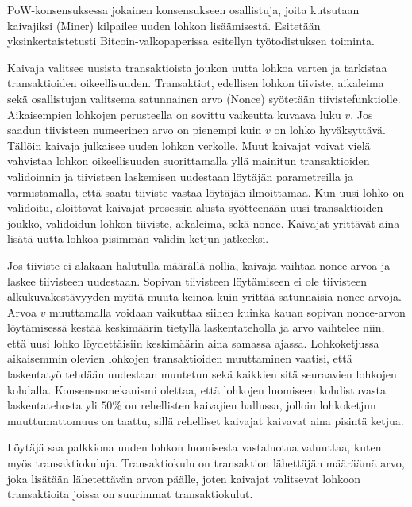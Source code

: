 PoW-konsensuksessa jokainen konsensukseen osallistuja, joita kutsutaan kaivajiksi (Miner) kilpailee uuden lohkon lisäämisestä. Esitetään yksinkertaistetusti Bitcoin-valkopaperissa esitellyn työtodistuksen toiminta.

Kaivaja valitsee uusista transaktioista joukon uutta lohkoa varten ja tarkistaa transaktioiden oikeellisuuden. Transaktiot, edellisen lohkon tiiviste, aikaleima sekä osallistujan valitsema satunnainen arvo (Nonce) syötetään tiivistefunktiolle. Aikaisempien lohkojen perusteella on sovittu vaikeutta kuvaava luku $v$. Jos saadun tiivisteen numeerinen arvo on pienempi kuin $v$ on lohko hyväksyttävä. Tällöin kaivaja julkaisee uuden lohkon verkolle. Muut kaivajat voivat vielä vahvistaa lohkon oikeellisuuden suorittamalla yllä mainitun transaktioiden validoinnin ja tiivisteen laskemisen uudestaan löytäjän parametreilla ja varmistamalla, että saatu tiiviste vastaa löytäjän ilmoittamaa. Kun uusi lohko on validoitu, aloittavat kaivajat prosessin alusta syötteenään uusi transaktioiden joukko, validoidun lohkon tiiviste, aikaleima, sekä nonce. Kaivajat yrittävät aina lisätä uutta lohkoa pisimmän validin ketjun jatkeeksi. 

Jos tiiviste ei alakaan halutulla määrällä nollia, kaivaja vaihtaa nonce-arvoa ja laskee tiivisteen uudestaan. Sopivan tiivisteen löytämiseen ei ole tiivisteen alkukuvakestävyyden myötä muuta keinoa kuin yrittää satunnaisia nonce-arvoja. Arvoa $v$ muuttamalla voidaan vaikuttaa siihen kuinka kauan sopivan nonce-arvon löytämisessä kestää keskimäärin tietyllä laskentateholla ja arvo vaihtelee niin, että uusi lohko löydettäisiin keskimäärin aina samassa ajassa. Lohkoketjussa aikaisemmin olevien lohkojen transaktioiden muuttaminen vaatisi, että laskentatyö tehdään uudestaan muutetun sekä kaikkien sitä seuraavien lohkojen kohdalla. Konsensusmekanismi olettaa, että lohkojen luomiseen kohdistuvasta laskentatehosta yli $50\%$ on rehellisten kaivajien hallussa, jolloin lohkoketjun muuttumattomuus on taattu, sillä rehelliset kaivajat kaivavat aina pisintä ketjua.

Löytäjä saa palkkiona uuden lohkon luomisesta vastaluotua valuuttaa, kuten myös transaktiokuluja. Transaktiokulu on transaktion lähettäjän määräämä arvo, joka lisätään lähetettävän arvon päälle, joten kaivajat valitsevat lohkoon transaktioita joissa on suurimmat transaktiokulut.

